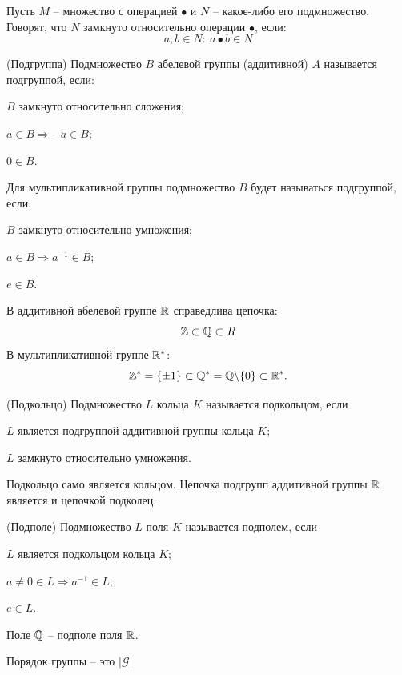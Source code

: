 \begin{multicols}{2}
Пусть $M$ -- множество с операцией $\bullet$ и $N$ -- какое-либо его подмножество. Говорят, что $N$ замкнуто относительно операции $\bullet$, если:\useshortskip
\[
    a,b\in N: \ a \bullet b \in N
    \]
\begin{definition}{(Подгруппа)}{}
    Подмножество $B$ абелевой группы (аддитивной) $A$ называется подгруппой, если:
    \begin{enumerate*}
        \item $B$ замкнуто относительно сложения;
        \item $a\in B \Longrightarrow -a \in B$;
        \item $0 \in B$.
    \end{enumerate*}
\end{definition}
\begin{note}{}{}
    Для мультипликативной группы подмножество $B$ будет называться подгруппой, если:
    \begin{enumerate*}
        \item $B$ замкнуто относительно умножения;
        \item $a\in B \Longrightarrow a^{-1} \in B$;
        \item $e \in B$.
    \end{enumerate*}
    В аддитивной абелевой группе $\mathbb{R}$ справедлива цепочка:\useshortskip
    \[
        \mathbb{Z} \subset \mathbb{Q} \subset R
        \]
    В мультипликативной группе $\mathbb{R}^*$:\useshortskip
    \[
        \mathbb{Z}^* = \{\pm 1\} \subset \mathbb{Q}^{*} = \mathbb{Q}\backslash \{0\} \subset \mathbb{R}^*.
        \]
\end{note}
\begin{definition}{(Подкольцо)}{}
    Подмножество $L$ кольца $K$ называется подкольцом, если 
    \begin{enumerate*}
        \item $L$ является подгруппой аддитивной группы кольца $K$;
        \item $L$ замкнуто относительно умножения.
    \end{enumerate*}
\end{definition}
Подкольцо само является кольцом. Цепочка подгрупп аддитивной группы $\mathbb{R}$ является и цепочкой подколец.
\begin{definition}{(Подполе)}{}
    Подмножество $L$ поля $K$ называется подполем, если 
    \begin{enumerate*}
        \item $L$ является подкольцом кольца $K$;
        \item $a\neq 0\in L \Longrightarrow a^{-1} \in L$;
        \item $e \in L.$
    \end{enumerate*}
\end{definition}
Поле $\mathbb{Q}$ -- подполе поля $\mathbb{R}$.
\par
Порядок группы -- это $|\mathcal{G}|$

\end{multicols}
